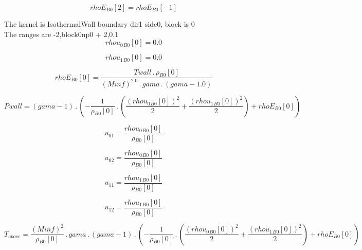 \documentclass{article}
\begin{document}
\begin{dmath}{rhoE{_{B0}}}[{2}] = {rhoE{_{B0}}}[{-1}]\end{dmath}

\noindent The kernel is IsothermalWall boundary dir1 side0, block is 0\\\noindent The ranges are -2,block0np0 + 2,0,1\\\begin{dmath}{rhou_{0}{_{B0}}}[{0}] = 0.0\end{dmath}

\begin{dmath}{rhou_{1}{_{B0}}}[{0}] = 0.0\end{dmath}

\begin{dmath}{rhoE{_{B0}}}[{0}] = \frac{Twall \,.\, {\rho{_{B0}}}[{0}]}{\left(Minf \right)^{2.0} \,.\, gama \,.\, \left(gama - 1.0\right)}\end{dmath}

\begin{dmath}Pwall = \left(gama - 1\right) \,.\, \left(- \frac{1}{{\rho{_{B0}}}[{0}]} \,.\, \left(\frac{\left({rhou_{0}{_{B0}}}[{0}] \right)^{2}}{2} + \frac{\left({rhou_{1}{_{B0}}}[{0}] \right)^{2}}{2}\right) + {rhoE{_{B0}}}[{0}]\right)\end{dmath}

\begin{dmath}u_{01} = \frac{{rhou_{0}{_{B0}}}[{0}]}{{\rho{_{B0}}}[{0}]}\end{dmath}

\begin{dmath}u_{02} = \frac{{rhou_{0}{_{B0}}}[{0}]}{{\rho{_{B0}}}[{0}]}\end{dmath}

\begin{dmath}u_{11} = \frac{{rhou_{1}{_{B0}}}[{0}]}{{\rho{_{B0}}}[{0}]}\end{dmath}

\begin{dmath}u_{12} = \frac{{rhou_{1}{_{B0}}}[{0}]}{{\rho{_{B0}}}[{0}]}\end{dmath}

\begin{dmath}T_{above} = \frac{\left(Minf \right)^{2}}{{\rho{_{B0}}}[{0}]} \,.\, gama \,.\, \left(gama - 1\right) \,.\, \left(- \frac{1}{{\rho{_{B0}}}[{0}]} \,.\, \left(\frac{\left({rhou_{0}{_{B0}}}[{0}] \right)^{2}}{2} + 
\frac{\left({rhou_{1}{_{B0}}}[{0}] \right)^{2}}{2}\right) + {rhoE{_{B0}}}[{0}]\right)\end{dmath}
\end{document}
